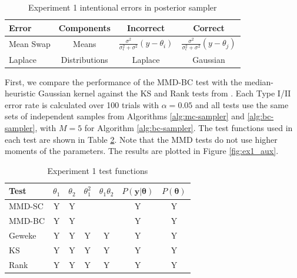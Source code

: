 \documentclass[a4paper,11pt]{article}
\begin{document}
\begin{table}[H]
    \centering
    \begin{tabular}{l|c|c|c}
         Error  & Components & Incorrect & Correct \\
         \hline
         Mean Swap & Means &  $\frac{\sigma^{2}}{\sigma_{\epsilon}^{2}+\sigma^{2}}\left(y-\theta_{i}\right)$ & $\frac{\sigma^{2}}{\sigma_{\epsilon}^{2}+\sigma^{2}}\left(y-\theta_{j}\right)$\\
         Laplace & Distributions & Laplace & Gaussian \\
    \end{tabular}
    \caption{Experiment 1 intentional errors in posterior sampler}
    \label{tab:ex1_errors}
\end{table}

First, we compare the performance of the MMD-BC test with the median-heuristic Gaussian kernel against the KS and Rank tests from \cite{gandy_unit_2020}. Each Type I/II error rate is calculated over 100 trials with $\alpha=0.05$ and all tests use the same sets of independent samples from Algorithms \ref{alg:mc-sampler} and \ref{alg:bc-sampler}, with $M=5$ for Algorithm \ref{alg:bc-sampler}. The test functions used in each test are shown in Table \ref{tab:ex1_testfn}. Note that the MMD tests do not use higher moments of the parameters. The results are plotted in Figure \ref{fig:ex1_aux}.

\begin{table}[H]
    \centering
    \begin{tabular}{l|c|c|c|c|c|c}
         Test  & $\theta_{1}$ & $\theta_{2}$ & $\theta_{1}^{2}$ & $\theta_{1}\theta_{2}$ & $P(\mathbf{y}|\mathbf{\theta})$ & $P(\mathbf{\theta})$ \\
         \hline
         MMD-SC & Y & Y & & & Y & Y \\
         MMD-BC & Y & Y & & & Y & Y \\
         Geweke & Y & Y & Y & Y & Y & Y \\
         KS & Y & Y & Y & Y & Y & Y \\
         Rank & Y & Y & Y & Y & Y & Y \\
    \end{tabular}
    \caption{Experiment 1 test functions}
    \label{tab:ex1_testfn}
\end{table}
\end{document}
